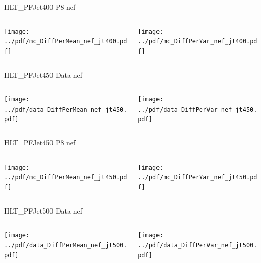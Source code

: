 \documentclass[9pt]{beamer}
\begin{document}
\begin{frame}[t]{HLT\_PFJet400 P8 nef}
\begin{columns}[T]
  \begin{column}{.5\textwidth}
  \texttt{[image: ../pdf/mc\_DiffPerMean\_nef\_jt400.pdf]}
  \end{column}
  \begin{column}{.5\textwidth}
  \texttt{[image: ../pdf/mc\_DiffPerVar\_nef\_jt400.pdf]}
  \end{column}
\end{columns}
\end{frame}

\begin{frame}[t]{HLT\_PFJet450 Data nef}
\begin{columns}[T]
  \begin{column}{.5\textwidth}
  \texttt{[image: ../pdf/data\_DiffPerMean\_nef\_jt450.pdf]}
  \end{column}
  \begin{column}{.5\textwidth}
  \texttt{[image: ../pdf/data\_DiffPerVar\_nef\_jt450.pdf]}
  \end{column}
\end{columns}
\end{frame}

\begin{frame}[t]{HLT\_PFJet450 P8 nef}
\begin{columns}[T]
  \begin{column}{.5\textwidth}
  \texttt{[image: ../pdf/mc\_DiffPerMean\_nef\_jt450.pdf]}
  \end{column}
  \begin{column}{.5\textwidth}
  \texttt{[image: ../pdf/mc\_DiffPerVar\_nef\_jt450.pdf]}
  \end{column}
\end{columns}
\end{frame}

\begin{frame}[t]{HLT\_PFJet500 Data nef}
\begin{columns}[T]
  \begin{column}{.5\textwidth}
  \texttt{[image: ../pdf/data\_DiffPerMean\_nef\_jt500.pdf]}
  \end{column}
  \begin{column}{.5\textwidth}
  \texttt{[image: ../pdf/data\_DiffPerVar\_nef\_jt500.pdf]}
  \end{column}
\end{columns}
\end{frame}
\end{document}
